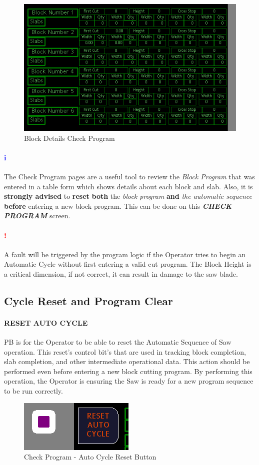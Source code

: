 \paragraph{}
\begin{figure}
	\centering
	\includegraphics[width=.5\linewidth]{screen-captures/program/pgm_review1-block-data}
	\caption{Block Details Check Program}
	\label{fig:pgm-review-block-data}
\end{figure}
\paragraph{\textbf{\LARGE \textcolor{blue}{i}}}The Check Program pages are a useful tool to review the \textit{Block Program} that was entered in a table form which shows details about each block and slab. Also, it is \textbf{strongly advised} to \textbf{reset} \textbf{both} the \textit{block program} \textbf{and} \textit{the automatic sequence} \textbf{before} entering a new block program. This can be done on this \textbf{\textit{CHECK PROGRAM}} screen.
\paragraph{\textbf{{\LARGE \textcolor{red}{!}}}}A fault will be triggered by the program logic if the Operator tries to begin an Automatic Cycle without first entering a valid cut program. The Block Height is a critical dimension, if not correct, it can result in damage to the saw blade.
\subsection{Cycle Reset and Program Clear}\paragraph*{RESET AUTO CYCLE}PB is for the Operator to be able to reset the Automatic Sequence of Saw operation. This reset's control bit's that are used in tracking block completion, slab completion, and other intermediate operational data. This action should be performed even before entering a new block cutting program. By performing this operation, the Operator is ensuring the Saw is ready for a new program sequence to be run correctly.
\begin{figure}
	\centering
	\includegraphics[width=.2\linewidth]{screen-captures/program/pgm_review1-aut-rst}
	\caption{Check Program - Auto Cycle Reset Button}
	\label{fig:pgm-review1-aut-rst}
\end{figure}
